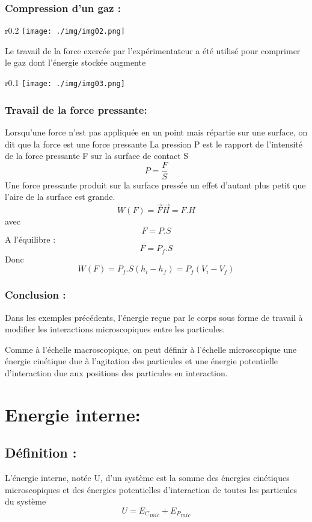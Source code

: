 \documentclass[12pt]{article}
\begin{document}
\subsubsection{Compression d’un gaz :  }
\begin{wrapfigure}{r}{0.2\textwidth}
    \texttt{[image: ./img/img02.png]}
\end{wrapfigure}


Le travail de la force exercée par
l’expérimentateur a été utilisé pour
comprimer le gaz dont l’énergie
stockée augmente
\begin{wrapfigure}{r}{0.1\textwidth}
    \texttt{[image: ./img/img03.png]}
\end{wrapfigure}



\subsubsection{Travail de la force pressante: }


Lorsqu’une force n’est pas appliquée en un point mais répartie sur une surface, on dit
que la force est une force pressante
La pression P est le rapport de l'intensité de la force pressante F sur la surface de
contact S
$$P =\frac{F}{S} $$
Une force pressante produit sur la surface pressée un effet d’autant plus petit que l’aire de la
surface est grande.
$$W(F) = \vec{F}\vec{H} = F.H$$
avec $$F = P.S$$
A l'équilibre : $$F=P_f.S$$
Donc
$$W(F) = P_f.S(h_i - h_f) = P_f(V_i - V_f)$$

\subsubsection{Conclusion :}
Dans les exemples précédents, l'énergie reçue par le corps sous forme de travail à modifier
les interactions microscopiques entre les particules.

Comme à l'échelle macroscopique, on peut définir à l'échelle microscopique une énergie
cinétique due à l'agitation des particules et une énergie potentielle d'interaction due aux
positions des particules en interaction.

\section{Energie interne: }
\subsection{Définition :  }
L’énergie interne, notée U, d’un système est la somme des énergies cinétiques
microscopiques et des énergies potentielles d'interaction de toutes les particules du système
$$U = {E_C}_{mic} + {E_P}_{mic}$$
\end{document}
